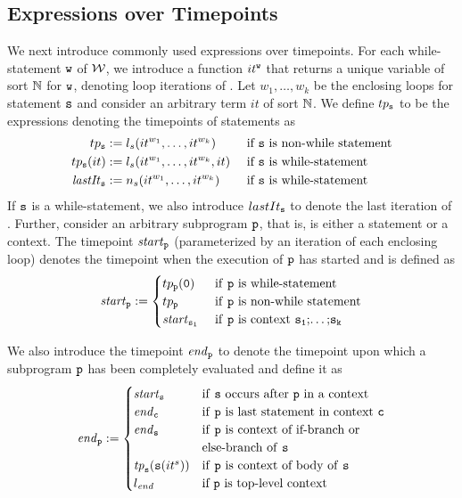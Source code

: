 \subsection{Expressions over Timepoints}\label{sec:tp}
We next introduce commonly used expressions over 
timepoints. 
%
For each  while-statement $\texttt{w}$ of $\mathcal{W}$, we introduce a
function  $it^{\texttt{w}}$  that returns a unique variable of sort
$\mathbb{N}$ for $\texttt{w}$, denoting loop iterations of . 
Let $w_1,\dots,w_k$  be the enclosing
loops for statement $\texttt{s}$ and consider an arbitrary term $it$ of
sort $\mathbb{N}$. We define $tp_{\texttt{s}}$ to be the expressions denoting 
the timepoints of statements  as%
%
\begin{align*}
tp_{\texttt{s}} &:= l_s(it^{w_1}, \dots, it^{w_k})&&\text{ if $\texttt{s}$ is non-while statement}\\
tp_{\texttt{s}}(it) &:= l_s(it^{w_1}, \dots, it^{w_k}, it) &&\text{ if $\texttt{s}$ is while-statement}\\
\mathit{lastIt}_{\texttt{s}} &:= n_s(it^{w_1}, \dots, it^{w_k})&&\text{ if $\texttt{s}$ is while-statement}
\end{align*}
%
If $\texttt{s}$ is a while-statement, we also introduce $lastIt_{\texttt{s}}$
to denote the last iteration of . 
Further, consider an arbitrary subprogram $\texttt{p}$, that is,  is either a statement or a context.
The timepoint $\mathit{start}_{\texttt{p}}$ (parameterized by an iteration
of each enclosing loop) denotes the timepoint when the execution of
$\texttt{p}$ has started and is defined as
$$\mathit{start}_{\texttt{p}} := 
\begin{cases}
tp_{\texttt{p}}({\tt 0}) &\text{ if \texttt{p} is while-statement}\\
tp_{\texttt{p}} &\text{ if \texttt{p} is non-while statement}\\
\mathit{start}_{\texttt{s}_1} &\text{ if \texttt{p} is context \texttt{s}$\mathtt{_{1}}$;$\dots$;\texttt{s}$\mathtt{_{k}}$}
\end{cases}
$$

%
We also introduce the timepoint $\mathit{end}_{\texttt{p}}$ to denote the
timepoint upon which a subprogram $\texttt{p}$ has been completely
evaluated and define it as
$$
\mathit{end}_{\texttt{p}}:=
\begin{cases}	
\mathit{start}_{\texttt{s}}  &\text{if \texttt{s} occurs after $\texttt{p}$ in a context}\\
\mathit{end}_{\texttt{c}}  &\text{if \texttt{p} is last statement in context \texttt{c}}\\
\mathit{end}_{\texttt{s}} &\text{if \texttt{p} is context of if-branch or } \\& \text{else-branch of \texttt{s}}\\
\mathit{tp}_{\texttt{s}}({\tt s}(it^{s})) &\text{if \texttt{p} is context of body of \texttt{s}} \\
l_\mathit{end} &\text{if $\texttt{p}$ is top-level context}\\
\end{cases}
$$

